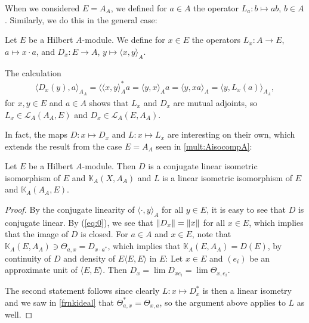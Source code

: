 When we considered $E=A_A$, we defined for $a \in A$ the operator $L_a\colon b \mapsto ab$, $b \in A$. Similarly, we do this in the general case:
\begin{definition}
	Let $E$ be a Hilbert $A$-module. We define for $x \in E$ the operators $L_x\colon A \to E$, $a \mapsto x \cdot a$, and $D_x \colon E \to A$, $y \mapsto \langle x,y\rangle_A$.
\end{definition}
\begin{remark}
The calculation	
\begin{align*}
	\langle D_x(y), a \rangle_{A_A} = \langle \langle x,y\rangle_A^*a = \langle y,x \rangle_A a = \langle y , x a \rangle_A = \langle y, L_x(a)\rangle_{A_A},
\end{align*}
for $x,y \in E$ and $a \in A$ shows that $L_x$ and $D_x$ are mutual adjoints, so $L_x \in \mathcal{L}_A(A_A,E)$ and $D_x \in \mathcal{L}_A(E,A_A)$.
\end{remark}
In fact, the maps $D \colon x \mapsto D_x$ and $L \colon x \mapsto L_x$ are interesting on their own, which extends the result from the case $E=A_A$ seen in \ref{mult:AisocompA}:
\begin{lemma}
	Let $E$ be a Hilbert $A$-module. Then $D$ is a conjugate linear isometric isomorphism of $E$ and $\mathbb{K}_A(X,A_A)$ and $L$ is a linear isometric isomorphism of $E$ and $\mathbb{K}_A(A_A,E)$.
	\label{mult:isocompactgen}
\end{lemma}
\begin{proof}
	By the conjugate linearity of $\langle \cdot , y \rangle_A$ for all $ y \in E$, it is easy to see that $D$ is conjugate linear.	By (\ref{eq:0}), we see that $\left\lVert D_x \right\rVert = \left\lVert x \right\rVert$ for all $x \in E$, which implies that the image of $D$ is closed. For $a \in A$ and $x \in E$, note that $ \mathbb{K}_A(E,A_A) \ni \Theta_{a,x}=D_{x\cdot a^*}$, which implies that $\mathbb{K}_A(E,A_A) = D(E)$, by continuity of $D$ and density of $E\langle E,E\rangle$ in $E$: Let $x \in E$ and $(e_i)$ be an approximate unit of $\langle E,E \rangle$. Then $D_x = \lim D_{x e_i} = \lim \Theta_{x, e_i}$.

	The second statement follows since clearly $L \colon x \mapsto D_x^*$ is then a linear isometry and we saw in \ref{frnkideal} that $\Theta_{a,x}^* = \Theta_{x,a}$, so the argument above applies to $L$ as well.
\end{proof}

